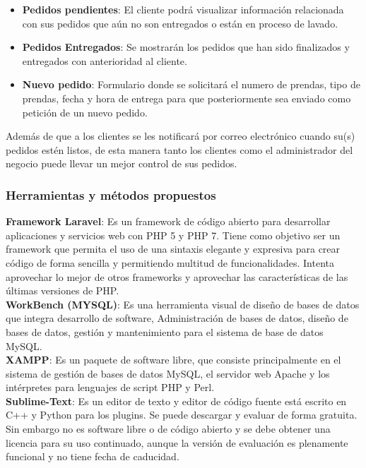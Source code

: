 \begin{itemize}
\item \textbf{Pedidos pendientes}: El cliente podrá visualizar información relacionada con sus pedidos que aún no son entregados o están en proceso de lavado.

\item \textbf{Pedidos Entregados}: Se mostrarán los pedidos que han sido finalizados y entregados con anterioridad al cliente.

\item \textbf{Nuevo pedido}: Formulario donde se solicitará el numero de prendas, tipo de prendas, fecha y hora de entrega para que posteriormente sea enviado como petición de un nuevo pedido.
\end{itemize}



Además de que a los clientes se les notificará por correo electrónico cuando su(s) pedidos estén listos, de esta manera tanto los clientes como el administrador del negocio puede llevar un mejor control de sus pedidos.


\subsubsection{Herramientas y métodos propuestos}


\textbf{Framework Laravel}: Es un framework de código abierto para desarrollar aplicaciones y servicios web con PHP 5 y PHP 7. Tiene como objetivo ser un framework que permita el uso de una sintaxis elegante y expresiva para crear código de forma sencilla y permitiendo multitud de funcionalidades. Intenta aprovechar lo mejor de otros frameworks y aprovechar las características de las últimas versiones de PHP.\\

\textbf{WorkBench (MYSQL)}: Es una herramienta visual de diseño de bases de datos que integra desarrollo de software, Administración de bases de datos, diseño de bases de datos, gestión y mantenimiento para el sistema de base de datos MySQL.\\

\textbf{XAMPP}: Es un paquete de software libre, que consiste principalmente en el sistema de gestión de bases de datos MySQL, el servidor web Apache y los intérpretes para lenguajes de script PHP y Perl.\\

\textbf{Sublime-Text}:  Es un editor de texto y editor de código fuente está escrito en C++ y Python para los plugins. Se puede descargar y evaluar de forma gratuita. Sin embargo no es software libre o de código abierto y se debe obtener una licencia para su uso continuado, aunque la versión de evaluación es plenamente funcional y no tiene fecha de caducidad.\\

